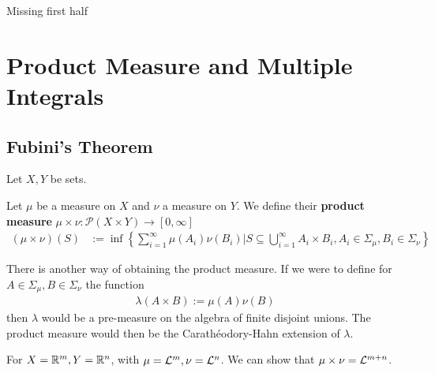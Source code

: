 
\begin{center}
  Missing first half
\end{center}


\section{Product Measure and Multiple Integrals}

\subsection{Fubini's Theorem}
Let $X,Y$ be sets.

\begin{dfn}[]
Let $\mu$ be a measure on $X$ and $\nu$ a measure on $Y$.
We define their \textbf{product measure} 
$
\mu \times \nu: \mathcal{P}(X \times Y) \to [0,\infty]
$
\begin{align*}
  (\mu \times \nu)(S) &:=
  \inf
  \left\{
    \sum_{i=1}^{\infty} \mu(A_i) \nu(B_i) \big\vert S \subseteq \bigcup_{i=1}^{\infty} A_i \times B_i, A_i\in \Sigma_{\mu}, B_i \in \Sigma_{\nu}
  \right\}
\end{align*}
\end{dfn}

\begin{rem}[]
There is another way of obtaining the product measure.
If we were to define for $A \in \Sigma_{\mu}, B \in \Sigma_{\nu}$ the function
\begin{align*}
  \lambda(A \times B) := \mu(A) \nu(B)
\end{align*}
then $\lambda$ would be a pre-measure on the algebra of finite disjoint unions.
The product measure would then be the Carathéodory-Hahn extension of $\lambda$.
\end{rem}

\begin{ex}[]
For $X = \mathbb{R}^{m},Y = \mathbb{R}^{n}$, with $\mu = \mathcal{L}^{m}, \nu = \mathcal{L}^{n}$. We can show that $\mu \times \nu = \mathcal{L}^{m+n}$.
\end{ex}






